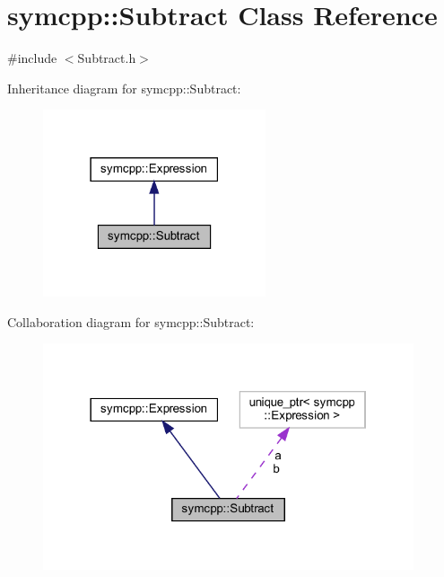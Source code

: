 \hypertarget{classsymcpp_1_1Subtract}{}\section{symcpp\+::Subtract Class Reference}
\label{classsymcpp_1_1Subtract}


{\ttfamily \#include $<$Subtract.\+h$>$}



Inheritance diagram for symcpp\+::Subtract\+:
\nopagebreak
\begin{figure}[H]
\begin{center}
\leavevmode
\includegraphics[width=186pt]{classsymcpp_1_1Subtract__inherit__graph}
\end{center}
\end{figure}


Collaboration diagram for symcpp\+::Subtract\+:
\nopagebreak
\begin{figure}[H]
\begin{center}
\leavevmode
\includegraphics[width=310pt]{classsymcpp_1_1Subtract__coll__graph}
\end{center}
\end{figure}
